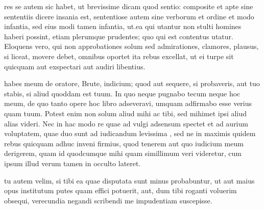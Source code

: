  res se autem sic habet, ut brevissime dicam quod sentio: composite et apte sine sententiis dicere insania est, sententiose autem sine verborum et ordine et modo infantia, sed eius modi tamen infantia, ut.ea qui utantur non stulti homines haberi possint, etiam plerumque prudentes; quo qui est contentus utatur. Eloquens vero, qui non approbationes solum sed admirationes, clamores, plausus, si liceat, movere debet, omnibus oportet ita rebus excellat, ut ei turpe sit quicquam aut exspectari aut audiri libentius.

 habes meum de oratore, Brute, indicium; quod aut sequere, si probaveris, aut tuo stabis, si aliud quoddam est tuum. In quo neque pugnabo tecum neque hoc meum, de quo tanto opere hoc libro adseveravi, umquam adfirmabo esse verius quam tuum. Potest enim non solum aliud mihi ac tibi, sed mihimet ipsi aliud alias videri. Nec in hac modo re quae ad vulgi adsensum spectet et ad aurium voluptatem, quae duo sunt ad iudicandum levissima , sed ne in maximis quidem rebus quicquam adhuc inveni firmius, quod tenerem aut quo iudicium meum derigerem, quam id quodcumque mihi quam simillimum veri videretur, cum ipsum illud verum tamen in occulto lateret.

 tu autem velim, si tibi ea quae disputata sunt minus probabuntur, ut aut maius opus institutum putes quam effici potuerit, aut, dum tibi roganti voluerim obsequi, verecundia negandi scribendi me impudentiam suscepisse.
